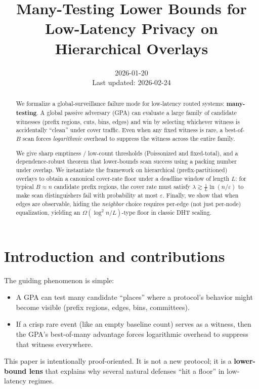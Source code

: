 \documentclass[
 11pt,
]{article}
\title{Many-Testing Lower Bounds for Low-Latency Privacy on Hierarchical Overlays}
\author{}
\date{2026-01-20\\Last updated: 2026-02-24}
\providecommand{\tightlist}{%
 \setlength{\itemsep}{0pt}\setlength{\parskip}{0pt}}
\begin{document}
\maketitle

\begin{abstract}
We formalize a global-surveillance failure mode for low-latency routed systems:
\textbf{many-testing}. A global passive adversary (GPA) can evaluate a large
family of candidate witnesses (prefix regions, cuts, bins, edges) and win by
selecting whichever witness is accidentally ``clean'' under cover traffic.
Even when any fixed witness is rare, a best-of-$B$ scan forces
\emph{logarithmic} overhead to suppress the witness across the entire family.

We give sharp emptiness / low-count thresholds (Poissonized and fixed-total),
and a dependence-robust theorem that lower-bounds scan success using a packing
number under overlap. We instantiate the framework on hierarchical
(prefix-partitioned) overlays to obtain a canonical cover-rate floor under a
deadline window of length $L$: for typical $B\approx n$ candidate prefix
regions, the cover rate must satisfy $\lambda \gtrsim \frac{1}{L}\ln(n/\varepsilon)$
to make scan distinguishers fail with probability at most $\varepsilon$.
Finally, we show that when edges are observable, hiding the \emph{neighbor}
choice requires per-edge (not just per-node) equalization, yielding an
$\Omega(\log^2 n/L)$-type floor in classic DHT scaling.
\end{abstract}

\tableofcontents
\newpage

\section{Introduction and
contributions}\label{introduction-and-contributions}

The guiding phenomenon is simple:

\begin{itemize}
\tightlist
\item
 A GPA can test many candidate ``places'' where a protocol's behavior
 might become visible (prefix regions, edges, bins, committees).
\item
 If a crisp rare event (like an empty baseline count) serves as a
 witness, then the GPA's best-of-many advantage forces logarithmic
 overhead to suppress that witness everywhere.
\end{itemize}

This paper is intentionally proof-oriented. It is not a new protocol; it
is a \textbf{lower-bound lens} that explains why several natural
defenses ``hit a floor'' in low-latency regimes.
\end{document}
